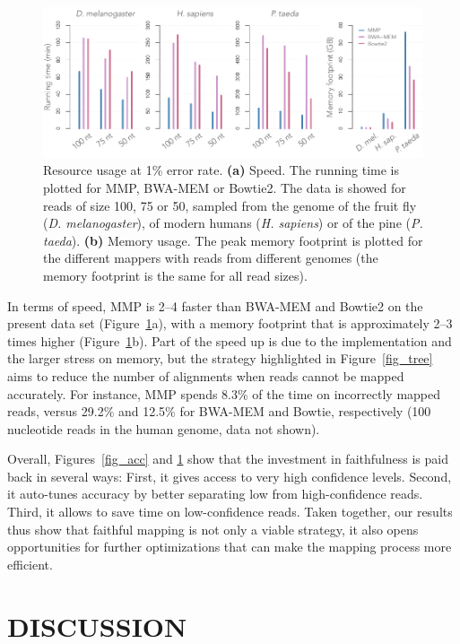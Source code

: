\documentclass[a4,center,fleqn]{NAR}
\begin{document}
\begin{figure}[t]
\begin{center}
\includegraphics[scale=.58]{fig_timem.pdf}
\end{center}
\caption{Resource usage at 1\% error rate. \textbf{(a)} Speed. The running
time is plotted for MMP, BWA-MEM or Bowtie2. The data is showed for reads
of size 100, 75 or 50, sampled from the genome of the fruit fly
(\textit{D. melanogaster}), of modern humans (\textit{H. sapiens}) or of
the pine (\textit{P. taeda}). \textbf{(b)} Memory usage. The peak memory
footprint is plotted for the different mappers with reads from different
genomes (the memory footprint is the same for all read sizes).}
\label{fig_timem}
\end{figure}

In terms of speed, MMP is 2--4 faster than BWA-MEM and Bowtie2 on the
present data set (Figure~\ref{fig_timem}a), with a memory footprint that
is approximately 2--3 times higher (Figure~\ref{fig_timem}b). Part of the
speed up is due to the implementation and the larger stress on memory, but
the strategy highlighted in Figure~\ref{fig_tree} aims to reduce the
number of alignments when reads cannot be mapped accurately. For instance,
MMP spends 8.3\% of the time on incorrectly mapped reads, versus 29.2\%
and 12.5\% for BWA-MEM and Bowtie, respectively (100 nucleotide reads in
the human genome, data not shown).

Overall, Figures~\ref{fig_acc} and \ref{fig_timem} show that the
investment in faithfulness is paid back in several ways: First, it gives
access to very high confidence levels. Second, it auto-tunes accuracy by
better separating low from high-confidence reads. Third, it allows to save
time on low-confidence reads. Taken together, our results thus show that
faithful mapping is not only a viable strategy, it also opens
opportunities for further optimizations that can make the mapping process
more efficient.

\section{DISCUSSION}
\end{document}
